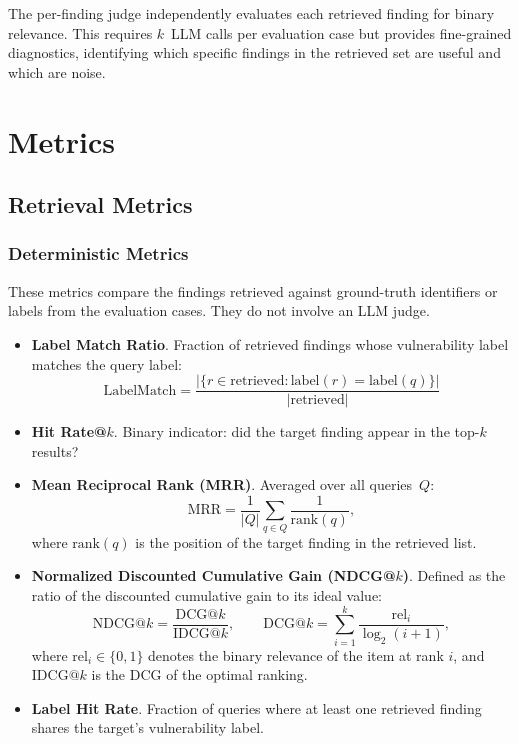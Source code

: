 The per-finding judge independently evaluates each retrieved finding for binary relevance. This requires $k$~LLM calls per evaluation case but provides fine-grained diagnostics, identifying which specific findings in the retrieved set are useful and which are noise.


\section{Metrics}
\label{sec:metrics}

\subsection{Retrieval Metrics}
\label{subsec:retrieval-metrics}

\subsubsection*{Deterministic Metrics}
These metrics compare the findings retrieved against ground-truth identifiers or labels from the evaluation cases. They do not involve an LLM judge.

\begin{itemize}
    \item \textbf{Label Match Ratio}. Fraction of retrieved findings whose vulnerability label matches the query label:
    \begin{equation}
        \text{LabelMatch} = \frac{|\{r \in \text{retrieved} : \text{label}(r) = \text{label}(q)\}|}{|\text{retrieved}|}
    \end{equation}

    \item \textbf{Hit Rate@$k$}. Binary indicator: did the target finding appear in the top-$k$ results?

    \item \textbf{Mean Reciprocal Rank (MRR)}. Averaged over all queries~$Q$:
    \begin{equation}
        \text{MRR} = \frac{1}{|Q|}\sum_{q \in Q} \frac{1}{\text{rank}(q)},
    \end{equation}
    where $\text{rank}(q)$ is the position of the target finding in the retrieved list.

    \item \textbf{Normalized Discounted Cumulative Gain (NDCG@$k$)}. Defined as the ratio of the discounted cumulative gain to its ideal value:
    \begin{equation}
        \text{NDCG@}k = \frac{\text{DCG@}k}{\text{IDCG@}k}, \qquad \text{DCG@}k = \sum_{i=1}^{k} \frac{\text{rel}_i}{\log_2(i + 1)},
    \end{equation}
    where $\text{rel}_i \in \{0, 1\}$ denotes the binary relevance of the item at rank $i$, and $\text{IDCG@}k$ is the DCG of the optimal ranking.

    \item \textbf{Label Hit Rate}. Fraction of queries where at least one retrieved finding shares the target's vulnerability label.
\end{itemize}


